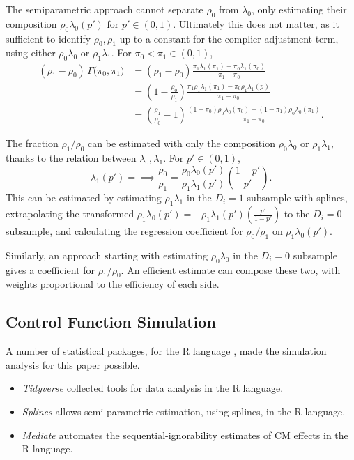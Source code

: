 The semiparametric approach cannot separate $\rho_0$ from $\lambda_0$, only estimating their composition $\rho_0 \lambda_0(p')$ for $p' \in (0,1)$.
Ultimately this does not matter, as it sufficient to identify $\rho_0, \rho_1$ up to a constant for the complier adjustment term, using either $\rho_0 \lambda_0$ or $\rho_1 \lambda_1$.
For $\pi_0 < \pi_1 \in (0,1)$,
\begin{align*}
    (\rho_1 - \rho_0) \, \Gamma \big(\pi_0, \pi_1 \big)
    &= (\rho_1 - \rho_0) \frac{\pi_1\lambda_1\left(\pi_1\right) - \pi_0\lambda_1\left(\pi_0\right)}{\pi_1 - \pi_0} \\
    &= \left(1 - \frac{\rho_0}{\rho_1}\right) \frac{
        \pi_1 \rho_1 \lambda_1\left(\pi_1\right) - \pi_0 \rho_1 \lambda_1\left(p\right)}{\pi_1 - \pi_0} \\
    &= \left(\frac{\rho_1}{\rho_0} - 1 \right) \frac{
        (1 - \pi_0) \rho_0 \lambda_0\left(\pi_0\right) - (1 - \pi_1) \rho_0 \lambda_0\left(\pi_1\right)}{\pi_1 - \pi_0}.
\end{align*}

The fraction $\rho_1 / \rho_0$ can be estimated with only the composition $\rho_0 \lambda_0$ or $\rho_1 \lambda_1$, thanks to the relation between $\lambda_0, \lambda_1$.
For $p' \in (0,1)$,
\[ \lambda_1 \left(p'\right) = 
    \implies 
        \frac{\rho_0}{\rho_1} = 
        \frac{\rho_0 \lambda_0 \left(p'\right)}{ \rho_1 \lambda_1 \left(p'\right)}
        \left( \frac{1-p'}{p'} \right). \]
This can be estimated by estimating $\rho_1 \lambda_1$ in the $D_i = 1$ subsample with splines, extrapolating the transformed $\rho_1 \lambda_0(p') = -\rho_1\lambda_1 \left(p'\right) \left( \frac{p'}{1 - p'} \right)$ to the $D_i = 0$ subsample, and calculating the regression coefficient for $\rho_0 / \rho_1$ on $\rho_1 \lambda_0(p')$.

Similarly, an approach starting with estimating $\rho_0 \lambda_0$ in the $D_i = 0$ subsample gives a coefficient for $\rho_1 / \rho_0$.
An efficient estimate can compose these two, with weights proportional to the efficiency of each side.

\subsection{Control Function Simulation}
A number of statistical packages, for the R language \citep{R2023}, made the simulation analysis for this paper possible.
\begin{itemize}
    \item \textit{Tidyverse} \citep{tidyverse} collected tools for data analysis in the R language.
    \item \textit{Splines} \citep{wang2021shape} allows semi-parametric estimation, using splines, in the R language.
    \item \textit{Mediate} \citep{tingley2014mediation} automates the sequential-ignorability estimates of CM effects \citep{imai2010identification} in the R language.
\end{itemize}

